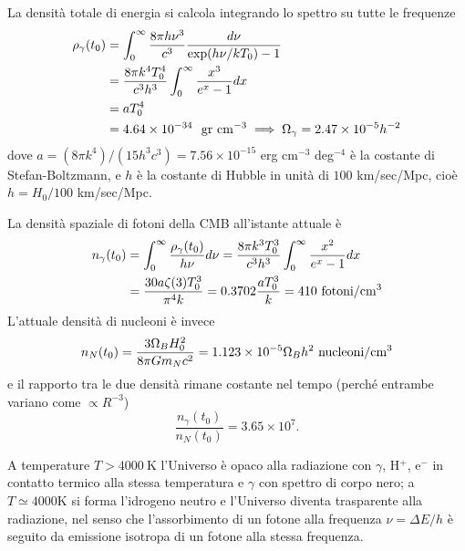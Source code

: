 La densità totale di energia si calcola integrando lo spettro su tutte le
frequenze
\begin{equation}
  \begin{split}
    \rho_{\gamma}(t_0)
    & =  \int_0^{\infty} \frac{8 \pi h \nu^3 } {c^3} \frac{d \nu} {\exp (h \nu/
      kT_0) -1} \\
    & = \frac{8 \pi k^4 T^4_0}{c^3 h^3} \int_0^{\infty} \frac{x^3}{e^{x} -1} dx
    \\
    & = a T^4_0 \\
    & = 4.64 \times 10^{-34}~~{\rm gr~cm^{-3}}  \implies \Omega_{\gamma} =2.47
    \times 10^{-5} h^{-2}
\end{split}
\end{equation}
dove $a=(8 \pi k^4)/(15 h^3 c^3) = 7.56 \times 10^{-15}$ erg cm$^{-3}$
deg$^{-4}$ è la costante di Stefan-Boltzmann, e $h$ è la costante di Hubble in
unità di $100$ km/sec/Mpc, cioè $h=H_0/100$ km/sec/Mpc.

La densità spaziale di fotoni della CMB all'istante attuale è
\begin{equation}
  \begin{split}
    n_{\gamma}(t_0) & = \int_0^{\infty} \frac{\rho_{\gamma}(t_0) } {h \nu } d\nu
    = \frac{8 \pi k^3 T^3_0 }{c^3 h^3} \int_0^{\infty} \frac{x^2}{e^x -1} dx \\
    & = \frac{30 a \zeta(3) T^3_0} {\pi^4 k} = 0.3702 \frac{a T^3_0}{k} = 410
    ~{\rm fotoni/cm^3}
  \end{split}
\end{equation}
L'attuale  densità di nucleoni  è invece
\begin{equation}
  n_N (t_0) = \frac{3 \Omega_B H_0^2}{8 \pi G m_N c^2} =
  1.123 \times 10^{-5} \Omega_B h^2 ~{\rm nucleoni/cm^3}
\end{equation}
e il rapporto tra le due densità rimane costante nel tempo (perché entrambe
variano come $\propto R^{-3}$)
\begin{equation}
  \frac{n_{\gamma}(t_0)}{n_N(t_0)} = 3.65 \times 10^{7}.
\end{equation}

A temperature $T>4000~$K l'Universo è opaco alla radiazione con $\gamma$, H$^+$,
e$^-$ in contatto termico alla stessa temperatura e $\gamma$ con spettro di
corpo nero; a $T \simeq 4000$K si forma l'idrogeno neutro e l'Universo diventa
trasparente alla radiazione, nel senso che l'assorbimento di un fotone alla
frequenza $\nu= \Delta E/h$ è seguito da emissione isotropa di un fotone alla
stessa frequenza.

